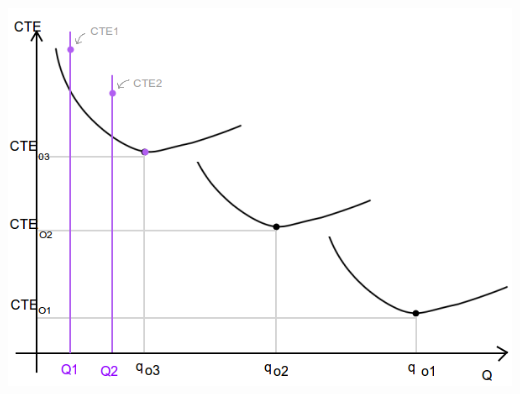 \documentclass[a4paper,10pt]{article}
\begin{document}
\begin{enumerate}
      \includegraphics[scale=0.4,keepaspectratio=true]{img/7/7_QvsCTE_5.png} 
 \end{enumerate}
\end{document}
